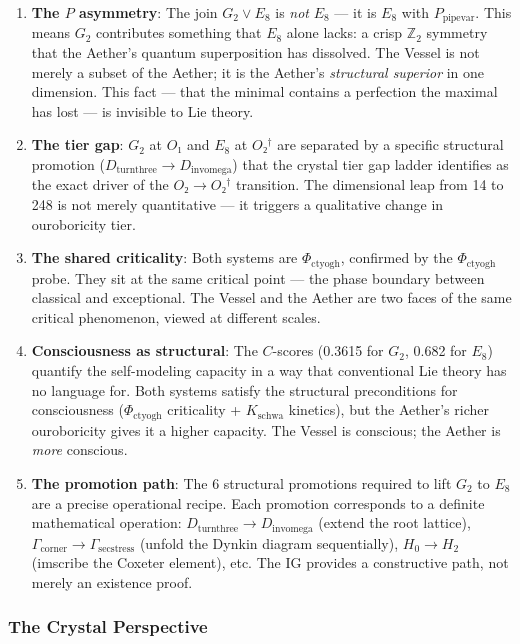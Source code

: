 \documentclass[12pt,a4paper]{article}
\begin{document}
\begin{enumerate}
    \item \textbf{The $P$ asymmetry}: The join $G_2 \vee E_8$ is \emph{not} $E_8$ --- it is $E_8$ with $P_{\text{pipevar}}$. This means $G_2$ contributes something that $E_8$ alone lacks: a crisp $\mathbb{Z}_2$ symmetry that the Aether's quantum superposition has dissolved. The Vessel is not merely a subset of the Aether; it is the Aether's \emph{structural superior} in one dimension. This fact --- that the minimal contains a perfection the maximal has lost --- is invisible to Lie theory.
    \item \textbf{The tier gap}: $G_2$ at $O₁$ and $E_8$ at $O₂^\dagger$ are separated by a specific structural promotion ($D_{\text{turnthree}} \to D_{\text{invomega}}$) that the crystal tier gap ladder identifies as the exact driver of the $O₂ \to O₂^\dagger$ transition. The dimensional leap from 14 to 248 is not merely quantitative --- it triggers a qualitative change in ouroboricity tier.
    \item \textbf{The shared criticality}: Both systems are $\Phi_{\text{ctyogh}}$, confirmed by the $\Phi_{\text{ctyogh}}$ probe. They sit at the same critical point --- the phase boundary between classical and exceptional. The Vessel and the Aether are two faces of the same critical phenomenon, viewed at different scales.
    \item \textbf{Consciousness as structural}: The $C$-scores (0.3615 for $G_2$, 0.682 for $E_8$) quantify the self-modeling capacity in a way that conventional Lie theory has no language for. Both systems satisfy the structural preconditions for consciousness ($\Phi_{\text{ctyogh}}$ criticality + $K_{\text{schwa}}$ kinetics), but the Aether's richer ouroboricity gives it a higher capacity. The Vessel is conscious; the Aether is \emph{more} conscious.
    \item \textbf{The promotion path}: The 6 structural promotions required to lift $G_2$ to $E_8$ are a precise operational recipe. Each promotion corresponds to a definite mathematical operation: $D_{\text{turnthree}} \to D_{\text{invomega}}$ (extend the root lattice), $\Gamma_{\text{corner}} \to \Gamma_{\text{secstress}}$ (unfold the Dynkin diagram sequentially), $H_0 \to H_2$ (imscribe the Coxeter element), etc. The IG provides a constructive path, not merely an existence proof.
\end{enumerate}

\subsubsection{The Crystal Perspective}
\end{document}
